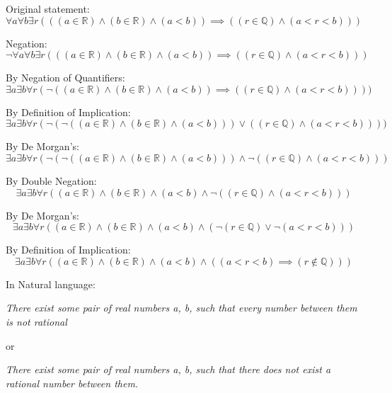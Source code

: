 \documentclass[11pt]{article}
\newcommand{\R}{\mathbb{R}}
\newcommand{\Q}{\mathbb{Q}}
\begin{document}
Original statement:
\[\forall a \forall b \exists r(((a\in\R)\land(b\in\R)\land(a<b)) \implies ((r\in\Q)\land(a<r<b)))\]

Negation:
\[\lnot\forall a \forall b \exists r(((a\in\R)\land(b\in\R)\land(a<b)) \implies ((r\in\Q)\land(a<r<b)))\]

By Negation of Quantifiers:
\[\exists a \exists b \forall r(\lnot((a\in\R)\land(b\in\R)\land(a<b)) \implies ((r\in\Q)\land(a<r<b))))\]

By Definition of Implication:
\[\exists a \exists b \forall r(\lnot(\lnot((a\in\R)\land(b\in\R)\land(a<b))) \lor ((r\in\Q)\land(a<r<b))))\]

By De Morgan's:
\[\exists a \exists b \forall r(\lnot(\lnot((a\in\R)\land(b\in\R)\land(a<b))) \land \lnot((r\in\Q)\land(a<r<b)))\]

By Double Negation:
\[\exists a \exists b \forall r((a\in\R)\land(b\in\R)\land(a<b) \land \lnot((r\in\Q)\land(a<r<b)))\]

By De Morgan's:
\[\exists a \exists b \forall r((a\in\R)\land(b\in\R)\land(a<b) \land (\lnot(r\in\Q)\lor \lnot(a<r<b)))\]

By Definition of Implication:
\[\exists a \exists b \forall r((a\in\R)\land(b\in\R)\land(a<b) \land ((a<r<b) \implies (r\notin\Q)))\]

In Natural language:
\begin{center}
    \emph{There exist some pair of real numbers a, b, such that every number between them is not rational}
\end{center}
or
\begin{center}
    \emph{There exist some pair of real numbers a, b, such that there does not exist a rational number between them.}
\end{center}
\end{document}

